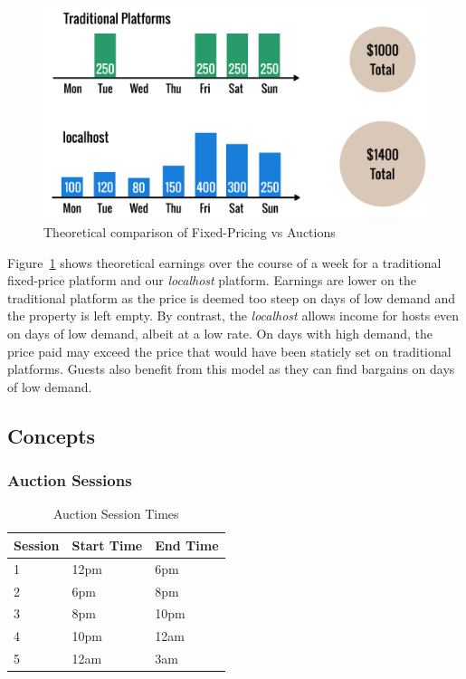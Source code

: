 \begin{figure}[!h]
  \includegraphics[width=\linewidth]{assets/fixedvsdynamic.png}
  \caption{Theoretical comparison of Fixed-Pricing vs Auctions}
  \label{fig:fixedVsDynamic}
\end{figure}

Figure~\ref{fig:fixedVsDynamic} shows theoretical earnings over the course of
a week for a traditional fixed-price platform and our \emph{localhost} platform.
Earnings are lower on the traditional platform as the price is deemed too steep
on days of low demand and the property is left empty.
By contrast, the \emph{localhost} allows income for hosts even on days of low demand, albeit
at a low rate. On days with high demand, the price paid may exceed the price that would
have been staticly set on traditional platforms. Guests also benefit from this model
as they can find bargains on days of low demand.

\subsection{Concepts}

\subsubsection{Auction Sessions}

\begin{table}[!h]
\centering
  \begin{tabular}{|l|l|l|}
  \hline
  Session & Start Time & End Time \\ \hline
  1       & 12pm       & 6pm      \\
  2       & 6pm        & 8pm      \\
  3       & 8pm        & 10pm     \\
  4       & 10pm       & 12am     \\
  5       & 12am       & 3am      \\ \hline
  \end{tabular}
  \caption{Auction Session Times}
  \label{tab:sessionTimes}
\end{table}

